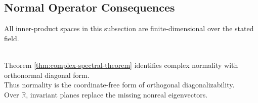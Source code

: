 \subsection{Normal Operator Consequences}

All inner-product spaces in this subsection are finite-dimensional over the stated field.

\begin{perspective} \label{per:normal-operators-coordinate-free-diagonal} \\
Theorem \ref{thm:complex-spectral-theorem} identifies complex normality with orthonormal diagonal form.\\
Thus normality is the coordinate-free form of orthogonal diagonalizability.\\
Over $\mathbb{R}$, invariant planes replace the missing nonreal eigenvectors.
\end{perspective}

